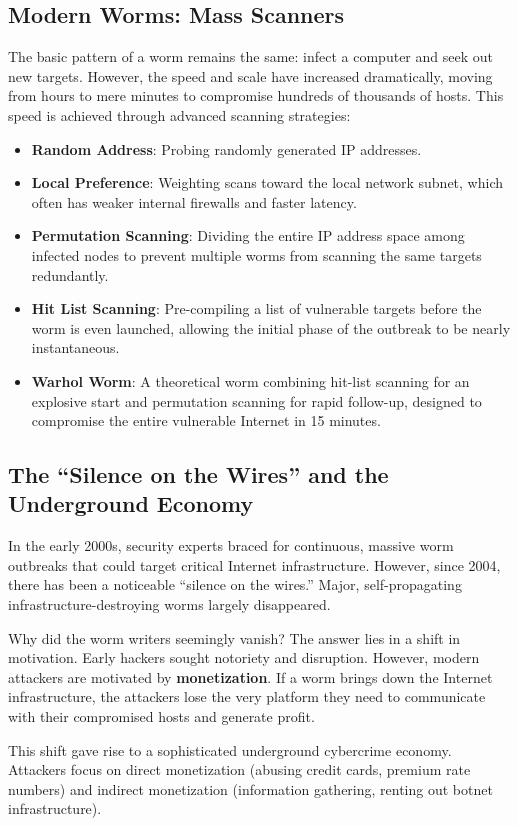 \subsection{Modern Worms: Mass Scanners}
The basic pattern of a worm remains the same: infect a computer and seek out new targets. However, the speed and scale have increased dramatically, moving from hours to mere minutes to compromise hundreds of thousands of hosts. This speed is achieved through advanced scanning strategies:
\begin{itemize}
    \item \textbf{Random Address}: Probing randomly generated IP addresses.
    \item \textbf{Local Preference}: Weighting scans toward the local network subnet, which often has weaker internal firewalls and faster latency.
    \item \textbf{Permutation Scanning}: Dividing the entire IP address space among infected nodes to prevent multiple worms from scanning the same targets redundantly.
    \item \textbf{Hit List Scanning}: Pre-compiling a list of vulnerable targets before the worm is even launched, allowing the initial phase of the outbreak to be nearly instantaneous.
    \item \textbf{Warhol Worm}: A theoretical worm combining hit-list scanning for an explosive start and permutation scanning for rapid follow-up, designed to compromise the entire vulnerable Internet in 15 minutes.
\end{itemize}

\subsection{The ``Silence on the Wires'' and the Underground Economy}
In the early 2000s, security experts braced for continuous, massive worm outbreaks that could target critical Internet infrastructure. However, since 2004, there has been a noticeable ``silence on the wires.'' Major, self-propagating infrastructure-destroying worms largely disappeared. 

Why did the worm writers seemingly vanish? The answer lies in a shift in motivation. Early hackers sought notoriety and disruption. However, modern attackers are motivated by \textbf{monetization}. If a worm brings down the Internet infrastructure, the attackers lose the very platform they need to communicate with their compromised hosts and generate profit.

This shift gave rise to a sophisticated underground cybercrime economy. Attackers focus on direct monetization (abusing credit cards, premium rate numbers) and indirect monetization (information gathering, renting out botnet infrastructure). 

